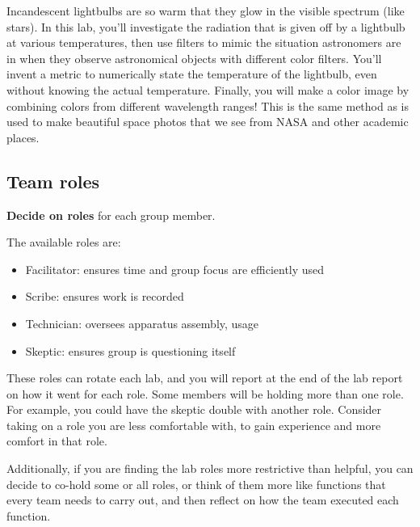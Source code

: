 Incandescent lightbulbs are so warm that they glow in the visible spectrum (like stars). In this lab, you'll investigate the radiation that is given off by a lightbulb at various temperatures, then use filters to mimic the situation astronomers are in when they observe astronomical objects with different color filters. You'll invent a metric to numerically state the temperature of the lightbulb, even without knowing the actual temperature. Finally, you will make a color image by combining colors from different wavelength
ranges!  This is the same method as is used to make beautiful space photos that
we see from NASA and other academic places.

\subsection{Team roles}

\begin{steps}
	\item \textbf{Decide on roles} for each group member.
\end{steps}

The available roles are:
\begin{itemize}
	\item Facilitator: ensures time and group focus are efficiently used
	\item Scribe: ensures work is recorded
	\item Technician: oversees apparatus assembly, usage
	\item Skeptic: ensures group is questioning itself
\end{itemize}

These roles can rotate each lab, and you will report at the end of the lab report on how it went for each role. Some members will be holding more than one role. For example, you could have the skeptic double with another role. Consider taking on a role you are less comfortable with, to gain experience and more comfort in that role.

Additionally, if you are finding the lab roles more restrictive than helpful, you can decide to co-hold some or all roles, or think of them more like functions that every team needs to carry out, and then reflect on how the team executed each function.

%

